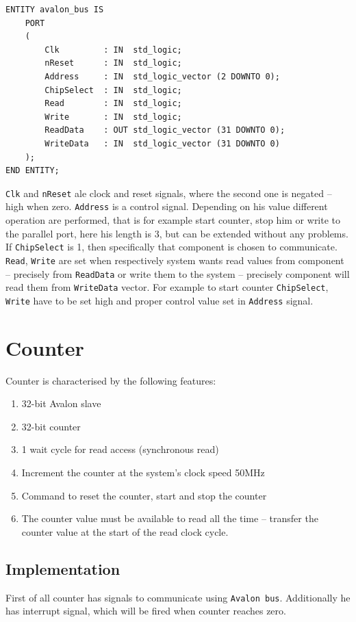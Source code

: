 \begin{verbatim}
ENTITY avalon_bus IS
    PORT
    (
        Clk         : IN  std_logic;
        nReset      : IN  std_logic;
        Address     : IN  std_logic_vector (2 DOWNTO 0);
        ChipSelect  : IN  std_logic;
        Read        : IN  std_logic;
        Write       : IN  std_logic;
        ReadData    : OUT std_logic_vector (31 DOWNTO 0);
        WriteData   : IN  std_logic_vector (31 DOWNTO 0)
    );
END ENTITY;
\end{verbatim}

\verb|Clk| and \verb|nReset| ale clock and reset signals, where the second one is negated -- high when zero. \verb|Address| is a control signal. Depending on his value different operation are performed, that is for example start counter, stop him or write to the parallel port, here his length is 3, but can be extended without any problems. If \verb|ChipSelect| is 1, then specifically that component is chosen to communicate. \verb|Read|, \verb|Write| are set when respectively system wants read values from component -- precisely from \verb|ReadData| or write them to the system -- precisely component will read them from \verb|WriteData| vector. For example to start counter \verb|ChipSelect|, \verb|Write| have to be set high and proper control value set in \verb|Address| signal.

\section{Counter}
Counter is characterised by the following features:
\begin{enumerate}
  \item 32-bit Avalon slave
  \item 32-bit counter
  \item 1 wait cycle for read access (synchronous read)
  \item Increment the counter at the system's clock speed 50MHz
  \item Command to reset the counter, start and stop the counter
  \item The counter value must be available to read all the time -- transfer the counter value at the start of the read clock cycle.
\end{enumerate}

\subsection{Implementation}
First of all counter has signals to communicate using \verb|Avalon bus|. Additionally he has interrupt signal, which will be fired when counter reaches zero. 


